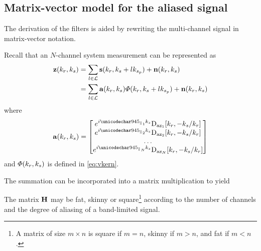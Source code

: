 \subsection{Matrix-vector model for the aliased signal}
The derivation of the filters is aided by rewriting the multi-channel signal in matrix-vector notation.
\par
Recall that an $N$-channel system measurement can be represented as
\begin{equation}
\begin{split}
 \mathbf{z}(k_r, k_{s}) &= \sum_{l\in\mathcal{L}}\mathbf{s}(k_r, k_{s} + lk_{s_p}) + \mathbf{n}(k_r, k_{s})\\
 &=\sum_{l\in\mathcal{L}}\mathbf{a}(k_r, k_{s})\varPhi(k_r, k_{s} + lk_{s_p}) + \mathbf{n}(k_r, k_{s})
\end{split}
\end{equation}
where
\begin{equation}
 \antennaVector(\kr, \kparm)=
 \begin{bmatrix}
  \eex{\im\alongtrackparm{1}\kparm}\dazPattern{1}[\kr, -\kparm/\kr]\\
  \eex{\im\alongtrackparm{2}\kparm}\dazPattern{2}[\kr, -\kparm/\kr]\\
  \ldots\\
  \eex{\im\alongtrackparm{N}\kparm}\dazPattern{N}[\kr, -\kparm/\kr]
 \end{bmatrix}
\end{equation}
and $\varPhi(k_r,k_{s})$ is defined in \eqref{eq:vkern}.
\par
The summation can be incorporated into a matrix multiplication to yield
\begin{center}
\end{center}
The matrix $\antennaMatrix$ may be fat, skinny or square\footnote{A matrix of size $m\times n$ is square if $m=n$, skinny if $m>n$, and fat if $m<n$.} according to the number of channels and the degree of aliasing of a band-limited signal.
